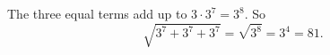 The three equal terms add up to $3\cdot3^7=3^8$. So
\[\sqrt{3^7+3^7+3^7}=\sqrt{3^8}=3^4=\boxed{81}.\]
